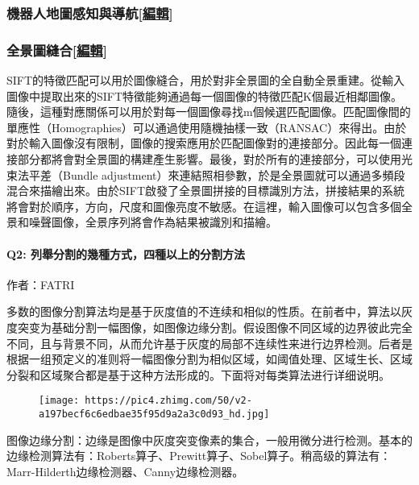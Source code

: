 \documentclass[
]{article}
\begin{document}
\hypertarget{header-n80}{%
\subsubsection{\texorpdfstring{機器人地圖感知與導航{[}\href{https://zh.wikipedia.org/w/index.php?title=尺度不變特徵轉換\&action=edit\&section=12}{編輯}{]}}{機器人地圖感知與導航{[}編輯{]}}}\label{header-n80}}

\hypertarget{header-n81}{%
\subsubsection{\texorpdfstring{全景圖縫合{[}\href{https://zh.wikipedia.org/w/index.php?title=尺度不變特徵轉換\&action=edit\&section=13}{編輯}{]}}{全景圖縫合{[}編輯{]}}}\label{header-n81}}

SIFT的特徵匹配可以用於圖像縫合，用於對非全景圖的全自動全景重建。從輸入圖像中提取出來的SIFT特徵能夠通過每一個圖像的特徵匹配K個最近相鄰圖像。隨後，這種對應關係可以用於對每一個圖像尋找m個候選匹配圖像。匹配圖像間的單應性（Homographies）可以通過使用隨機抽樣一致（RANSAC）來得出。由於對於輸入圖像沒有限制，圖像的搜索應用於匹配圖像對的連接部分。因此每一個連接部分都將會對全景圖的構建產生影響。最後，對於所有的連接部分，可以使用光束法平差（Bundle
adjustment）來連結照相參數，於是全景圖就可以通過多頻段混合來描繪出來。由於SIFT啟發了全景圖拼接的目標識別方法，拼接結果的系統將會對於順序，方向，尺度和圖像亮度不敏感。在這裡，輸入圖像可以包含多個全景和噪聲圖像，全景序列將會作為結果被識別和描繪。

\hypertarget{header-n83}{%
\paragraph{Q2:
列舉分割的幾種方式，四種以上的分割方法}\label{header-n83}}

作者：FATRI

多数的图像分割算法均是基于灰度值的不连续和相似的性质。在前者中，算法以灰度突变为基础分割一幅图像，如图像边缘分割。假设图像不同区域的边界彼此完全不同，且与背景不同，从而允许基于灰度的局部不连续性来进行边界检测。后者是根据一组预定义的准则将一幅图像分割为相似区域，如阈值处理、区域生长、区域分裂和区域聚合都是基于这种方法形成的。下面将对每类算法进行详细说明。

\begin{figure}
\centering
\texttt{[image: https://pic4.zhimg.com/50/v2-a197becf6c6edbae35f95d9a2a3c0d93\_hd.jpg]}
\caption{}
\end{figure}

图像边缘分割：边缘是图像中灰度突变像素的集合，一般用微分进行检测。基本的边缘检测算法有：Roberts算子、Prewitt算子、Sobel算子。稍高级的算法有：Marr-Hilderth边缘检测器、Canny边缘检测器。
\end{document}
